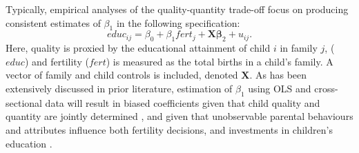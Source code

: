Typically, empirical analyses of the quality-quantity trade-off focus on 
producing consistent estimates of $\beta_1$ in the following specification:
\begin{equation}
\label{TWINeqn:secondstage}
educ_{ij}=\beta_0+\beta_1 fert_{j} + \bm{X}\bm{\beta}_2+u_{ij}.
\end{equation}
Here, quality is proxied by the educational attainment of child $i$ in family 
$j$, ($educ$) and fertility ($fert$) is measured as the total births in a child's
family.  A vector of family and child controls is included, denoted $\bm{X}$.  As
has been extensively discussed in prior literature, estimation of $\beta_1$ using
OLS and cross-sectional data will result in biased coefficients given that child 
quality and quantity are jointly determined \citep{BeckerLewis1973,BeckerTomes1976}, 
and given that unobservable parental behaviours and attributes influence both 
fertility decisions, and investments in children's education \citep{Qian2009}.

